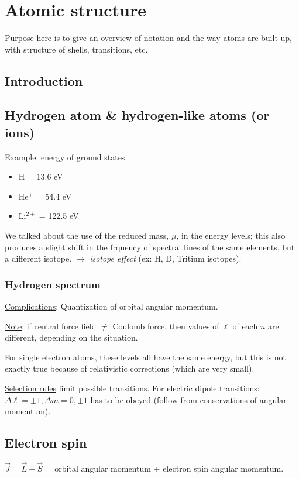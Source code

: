 \documentclass[11pt]{article}
\newcommand{\mar}[1]{\hspace{0pt}\marginpar{-\textcolor{black}{#1}-}}
\let\oldsection\section
\renewcommand\section{\clearpage\oldsection}
\begin{document}
\newpage
\section{Atomic structure}
\mar{I 1}Purpose here is to give an overview of notation and the way
atoms are built up, with structure of shells, transitions, etc.

\subsection{Introduction}

\subsection{Hydrogen atom \& hydrogen-like atoms (or ions)}
\mar{I 2}\underline{Example}: energy of ground states:
\begin{itemize}
    \item H = 13.6 eV
    \item He$^{+}$ = 54.4 eV
    \item Li$^{2+}$ = 122.5 eV
\end{itemize}

\mar{I 3}We talked about the use of the reduced mass, $\mu$, in the energy
levels; this also produces a slight shift in the frquency of spectral lines
of the same elements, but a different isotope.
$\rightarrow$ \textit{isotope effect} (ex: H, D, Tritium isotopes).

\subsubsection{Hydrogen spectrum}
\underline{Complications}: Quantization of orbital angular momentum.

\mar{I 4}\underline{Note}: if central force field $\neq$ Coulomb force,
then values of $\ell$ of each $n$ are different, depending on the situation.

\mar{I 5}For single electron atoms, these levels all have the same energy,
but this is not exactly true because of relativistic corrections
(which are very small).

\underline{Selection rules} limit possible transitions. For electric
dipole transitions: $\Delta\ell = \pm 1, \Delta{m} = 0, \pm 1$
has to be obeyed (follow from conservations of angular momentum).

\subsection{Electron spin}
\mar{I 6}$\vec{J} = \vec{L} + \vec{S}$ = orbital angular momentum + electron
spin angular momentum.
\end{document}
